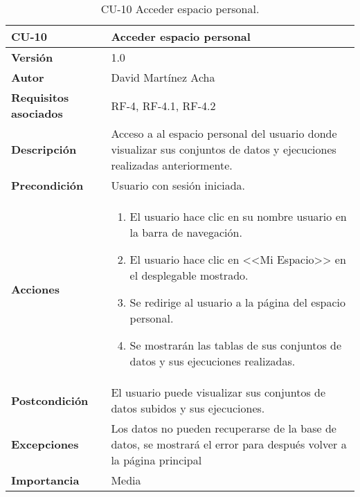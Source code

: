 \begin{table}[p]
	\centering
	\begin{tabularx}{\linewidth}{ p{} p{} }
		\toprule
		\textbf{CU-10}    & \textbf{Acceder espacio personal}\\
		\toprule
		\textbf{Versión}              & 1.0    \\
		\textbf{Autor}                & David Martínez Acha \\
		\textbf{Requisitos asociados} & RF-4, RF-4.1, RF-4.2 \\
		\textbf{Descripción}          & Acceso a al espacio personal del usuario donde visualizar sus conjuntos de datos y ejecuciones realizadas anteriormente. \\
		\textbf{Precondición}         & Usuario con sesión iniciada. \\
		\textbf{Acciones}             &
		\begin{enumerate}
			\def\labelenumi{\arabic{enumi}.}
			\tightlist
			\item El usuario hace clic en su nombre usuario en la barra de navegación.
			\item El usuario hace clic en <<Mi Espacio>> en el desplegable mostrado.
			\item Se redirige al usuario a la página del espacio personal.
			\item Se mostrarán las tablas de sus conjuntos de datos y sus ejecuciones realizadas.
		\end{enumerate}\\
		\textbf{Postcondición}        & El usuario puede visualizar sus conjuntos de datos subidos y sus ejecuciones. \\
		\textbf{Excepciones}          & Los datos no pueden recuperarse de la base de datos, se mostrará el error para después volver a la página principal\\
		\textbf{Importancia}          & Media \\
		\bottomrule
	\end{tabularx}
	\caption{CU-10 Acceder espacio personal.}
\end{table}


